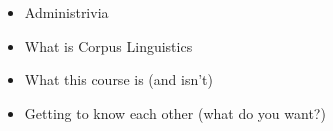\documentclass[a4paper,landscape,headrule,footrule]{foils}
\begin{document}
\maketitle



\begin{itemize}
\item Administrivia
\item What is Corpus Linguistics
\item What this course is (and isn't)
\item Getting to know each other (what do you want?)
\end{itemize}



\end{document}
